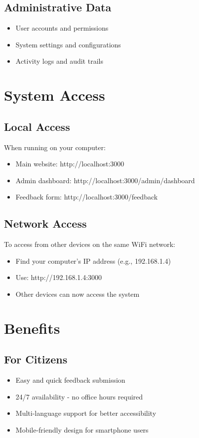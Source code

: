\documentclass[12pt,a4paper]{article}
\begin{document}
\subsection{Administrative Data}
\begin{itemize}
    \item User accounts and permissions
    \item System settings and configurations
    \item Activity logs and audit trails
\end{itemize}

\section{System Access}

\subsection{Local Access}
When running on your computer:
\begin{itemize}
    \item Main website: http://localhost:3000
    \item Admin dashboard: http://localhost:3000/admin/dashboard
    \item Feedback form: http://localhost:3000/feedback
\end{itemize}

\subsection{Network Access}
To access from other devices on the same WiFi network:
\begin{itemize}
    \item Find your computer's IP address (e.g., 192.168.1.4)
    \item Use: http://192.168.1.4:3000
    \item Other devices can now access the system
\end{itemize}

\section{Benefits}

\subsection{For Citizens}
\begin{itemize}
    \item Easy and quick feedback submission
    \item 24/7 availability - no office hours required
    \item Multi-language support for better accessibility
    \item Mobile-friendly design for smartphone users
\end{itemize}
\end{document}
